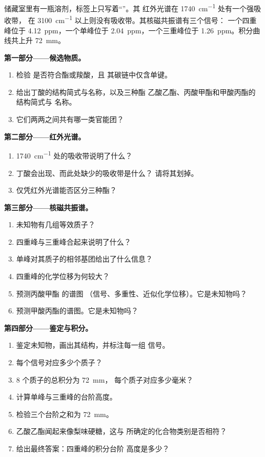\begin{problem}
\label{pb:g12:proton-nmr:1}
储藏室里有一瓶溶剂，标签上只写着“”。其
红外光谱在 \qty{1740}{cm^{-1}} 处有一个强吸收带，
在 \qty{3100}{cm^{-1}} 以上则没有吸收带。其核磁共振谱有三个信号：
一个四重峰位于 \qty{4.12}{ppm}，一个单峰位于 \qty{2.04}{ppm}，一个三重峰位于
\qty{1.26}{ppm}。积分曲线共上升 \qty{72}{mm}。

\medskip
\noindent\textbf{第一部分——候选物质。}
\begin{enumerate}
  \item 检验  是否符合酯或羧酸，且
        其碳链中仅含单键。
  \item 给出丁酸的结构简式与名称，以及三种酯
        乙酸乙酯、丙酸甲酯和甲酸丙酯的结构简式与
        名称。
  \item 它们两两之间共有哪一类官能团？
\end{enumerate}

\medskip
\noindent\textbf{第二部分——红外光谱。}
\begin{enumerate}[resume]
  \item \qty{1740}{cm^{-1}} 处的吸收带说明了什么？
  \item 丁酸会出现、而此处缺少的吸收带是什么？
        请将其划掉。
  \item 仅凭红外光谱能否区分三种酯？
\end{enumerate}

\medskip
\noindent\textbf{第三部分——核磁共振谱。}
\begin{enumerate}[resume]
  \item 未知物有几组等效质子？
  \item 四重峰与三重峰合起来说明了什么？
  \item 单峰对其质子的相邻基团给出了什么信息？
  \item 四重峰的化学位移为何较大？
  \item 预测丙酸甲酯  的谱图
        （信号、多重性、近似化学位移）。它是未知物吗？
  \item 预测甲酸丙酯的谱图。它是未知物吗？
\end{enumerate}

\medskip
\noindent\textbf{第四部分——鉴定与积分。}
\begin{enumerate}[resume]
  \item 鉴定未知物，画出其结构，并标注每一组
        信号。
  \item 每个信号对应多少个质子？
  \item 8 个质子的总积分为 \qty{72}{mm}，
        每个质子对应多少毫米？
  \item 计算单峰与三重峰的台阶高度。
  \item 检验三个台阶之和为 \qty{72}{mm}。
  \item 乙酸乙酯闻起来像梨味硬糖，这与
        所确定的化合物类别是否相符？
  \item 给出最终答案：四重峰的积分台阶
        高度是多少？
\end{enumerate}
\end{problem}
